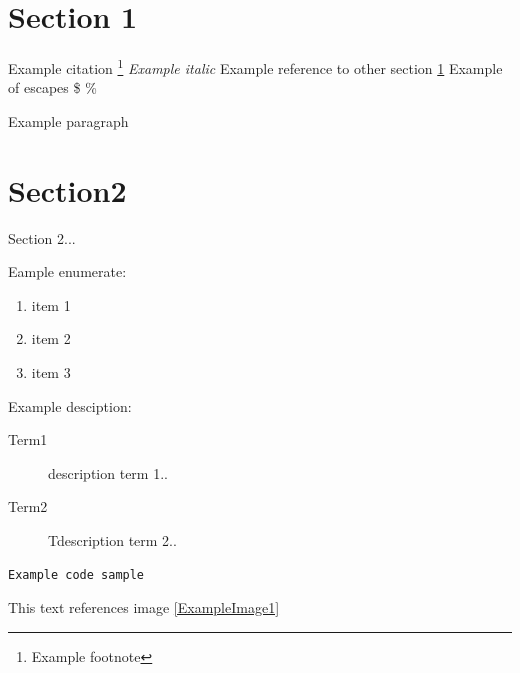 \section{Section 1}\label{section1}
Example citation\cite{exampleArticle}
\footnote{Example footnote}
\textit{Example italic}
Example reference to other section \ref{section1}
Example of escapes \$ \% \- 

Example paragraph

\section{Section2} \label{section2}
Section 2...


Eample enumerate: \begin{enumerate}
\item item 1
\item item 2
\item item 3
\end{enumerate}

Example desciption:

\begin{description}
\item [Term1] \label{term1}description term 1..
\item [Term2] \label{term2}Tdescription term 2..
\end{description}

\lstset{style=sharpc}
\begin{lstlisting}
Example code sample
\end{lstlisting}

This text references image \ref{ExampleImage1}

